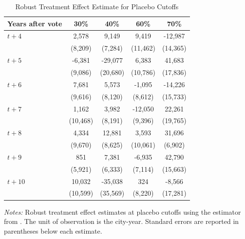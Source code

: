 \begin{table}[!ht]
    \centering
    \caption{Robust Treatment Effect Estimate for Placebo Cutoffs}
    \label{tab:placebo_cutoffs}
    \begin{threeparttable}
    \begin{minipage}{\linewidth}
    \centering
    \begin{tabular}{p{3cm}cccc}
        \hline
        Years after vote & 30\% & 40\% & 60\% & 70\% \\
        \hline
        $t + 4$ & 2,578 & 9,149 & 9,419 & -12,987 \\
                & (8,209) & (7,284) & (11,462) & (14,365) \\
        $t + 5$ & -6,381 & -29,077 & 6,383 & 41,683 \\
                & (9,086) & (20,680) & (10,786) & (17,836) \\
        $t + 6$ & 7,681 & 5,573 & -1,095 & -14,226 \\
                & (9,616) & (8,120) & (8,612) & (15,733) \\
        $t + 7$ & 1,162 & 3,982 & -12,050 & 22,261 \\
                & (10,468) & (8,191) & (9,396) & (19,765) \\
        $t + 8$ & 4,334 & 12,881 & 3,593 & 31,696 \\
                & (9,670) & (8,625) & (10,061) & (6,902) \\
        $t + 9$ & 851 & 7,381 & -6,935 & 42,790 \\
                & (5,921) & (6,333) & (7,114) & (15,663) \\
        $t + 10$ & 10,032 & -35,038 & 324 & -8,566 \\
                 & (10,599) & (35,569) & (8,220) & (17,281) \\
        \hline
    \end{tabular}
    \vspace{0.5em}
    \begin{tablenotes}[flushleft]
        \small
        \item \textit{Notes:} Robust treatment effect estimates at placebo cutoffs using the estimator from \cite{calonico2017rdrobust}. The unit of observation is the city-year. Standard errors are reported in parentheses below each estimate.
    \end{tablenotes}
    \end{minipage}
    \end{threeparttable}
\end{table}



